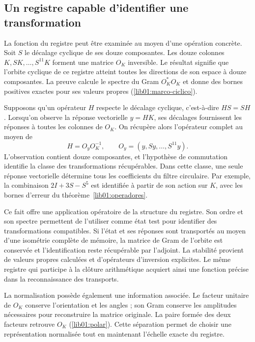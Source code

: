 \subsection*{Un registre capable d’identifier une transformation}
\label{libnar:identificacion}

La fonction du registre peut être examinée au moyen d’une opération
concrète. Soit \(S\) le décalage cyclique de ses douze
composantes. Les douze colonnes
\(K,SK,\ldots,S^{11}K\) forment une matrice \(O_K\) inversible.
Le résultat signifie que l’orbite cyclique de ce registre atteint
toutes les directions de son espace à douze composantes. La preuve
calcule le spectre du Gram \(O_K^*O_K\) et donne des bornes positives
exactes pour ses valeurs propres (\cref{lib01:marco-ciclico}).

Supposons qu’un opérateur \(H\) respecte le décalage cyclique,
c’est-à-dire \(HS=SH\). Lorsqu’on observe la réponse vectorielle \(y=HK\),
ses décalages fournissent les réponses à toutes les colonnes
de \(O_K\). On récupère alors l’opérateur complet au moyen de
\[
 H=O_yO_K^{-1},\qquad
 O_y=(y,Sy,\ldots,S^{11}y).
\]
L’observation contient douze composantes, et l’hypothèse de
commutation identifie la classe des transformations récupérables.
Dans cette classe, une seule réponse vectorielle détermine tous
les coefficients du filtre circulaire. Par exemple, la combinaison
\(2I+3S-S^5\) est identifiée à partir de son action sur \(K\),
avec les bornes d’erreur du théorème~\ref{lib01:operadores}.

Ce fait offre une application opératoire de la structure du registre. Son ordre et son spectre permettent de l'utiliser comme état test pour identifier des transformations compatibles. Si l'état et ses réponses sont transportés au moyen d'une isométrie complète de mémoire, la matrice de Gram de l'orbite est conservée et l'identification reste récupérable par l'adjoint. La stabilité provient de valeurs propres calculées et d'opérateurs d'inversion explicites. Le même registre qui participe à la clôture arithmétique acquiert ainsi une fonction précise dans la reconnaissance des transports.

La normalisation possède également une information associée. Le facteur
unitaire de \(O_K\) conserve l’orientation et les angles ; son Gram
conserve les amplitudes nécessaires pour reconstruire la matrice
originale. La paire formée des deux facteurs retrouve \(O_K\)
(\cref{lib01:polar}). Cette séparation permet de choisir une
représentation normalisée tout en maintenant l’échelle
exacte du registre.

